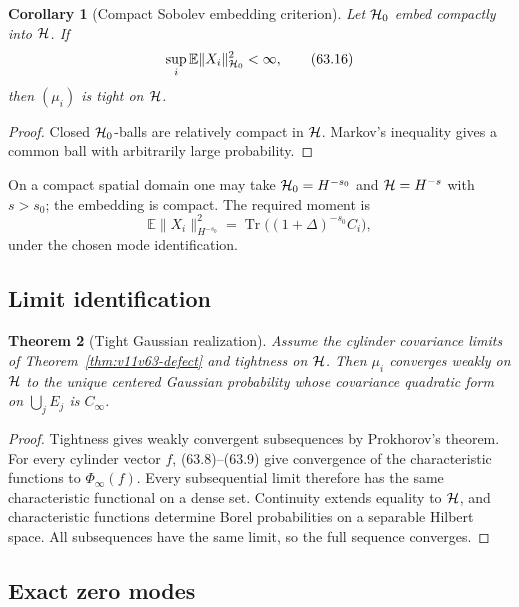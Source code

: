 \documentclass[11pt]{article}
\newtheorem{theorem}{Theorem}[section]
\newtheorem{corollary}[theorem]{Corollary}
\begin{document}
\begin{corollary}[Compact Sobolev embedding criterion]
\label{cor:v11v63-sobolev}
Let \({\cal H}_0\) embed compactly into \({\cal H}\).  If
\[
                         \sup_i\mathbb E\lVert X_i\rVert_{{\cal H}_0}^2
                              <\infty,                         \tag{63.16}
\]
then \((\mu_i)\) is tight on \({\cal H}\).
\end{corollary}

\begin{proof}
Closed \({\cal H}_0\)-balls are relatively compact in \({\cal H}\).
Markov's inequality gives a common ball with arbitrarily large
probability.
\end{proof}

On a compact spatial domain one may take
\({\cal H}_0=H^{-s_0}\) and \({\cal H}=H^{-s}\) with \(s>s_0\);
the embedding is compact.  The required moment is
\[
              \mathbb E\lVert X_i\rVert_{H^{-s_0}}^2
       =\operatorname{Tr}\bigl((1+\Delta)^{-s_0}C_i\bigr),    \tag{63.17}
\]
under the chosen mode identification.

\subsection{Limit identification}

\begin{theorem}[Tight Gaussian realization]
\label{thm:v11v63-realization}
Assume the cylinder covariance limits of
Theorem~\ref{thm:v11v63-defect} and tightness on \({\cal H}\).
Then \(\mu_i\) converges weakly on \({\cal H}\) to the unique centered
Gaussian probability whose covariance quadratic form on
\(\bigcup_jE_j\) is \(C_\infty\).
\end{theorem}

\begin{proof}
Tightness gives weakly convergent subsequences by Prokhorov's theorem.
For every cylinder vector \(f\), (63.8)--(63.9) give convergence of
the characteristic functions to \(\Phi_\infty(f)\).  Every
subsequential limit therefore has the same characteristic functional
on a dense set.  Continuity extends equality to \({\cal H}\), and
characteristic functions determine Borel probabilities on a separable
Hilbert space.  All subsequences have the same limit, so the full
sequence converges.
\end{proof}

\subsection{Exact zero modes}
\end{document}
